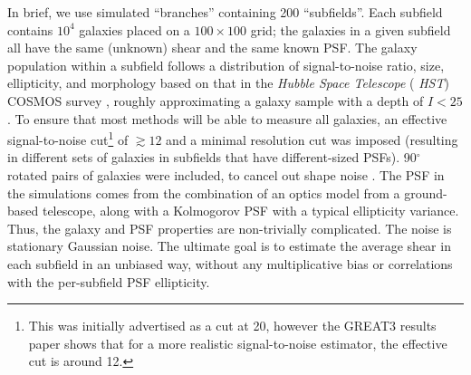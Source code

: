 \documentclass[iop]{emulateapj}
\newcommand\rmcomment[1]{\textcolor{red}{(RM: #1)}}
\begin{document}
In brief, we use simulated ``branches'' containing 200 ``subfields''.
Each subfield contains $10^4$ galaxies placed on a $100\times 100$
grid; the galaxies in a given subfield all have the same (unknown)
shear and the same known PSF.  The galaxy population within a subfield
follows a distribution of signal-to-noise ratio, size, ellipticity,
and morphology based on that in the {\it Hubble Space Telescope} ({\it
  HST}) COSMOS survey
\citep{2007ApJS..172..196K,2007ApJS..172....1S,2007ApJS..172...38S},
roughly approximating a galaxy sample with a depth of $I<25$.  To
ensure that most methods will be able to measure all galaxies, an
effective signal-to-noise cut\footnote{This was initially advertised as a cut at 20, however the
  GREAT3 results paper shows that for a more realistic signal-to-noise estimator, the effective cut
  is around 12.} of $\gtrsim 12$ and a minimal resolution
cut was imposed (resulting in different sets of galaxies in subfields
that have different-sized PSFs).  90$^\circ$ rotated pairs of galaxies
were included, to cancel out shape noise \citep{2007MNRAS.376...13M}.
The PSF in the simulations comes from the combination of an optics
model from a ground-based telescope, along with a Kolmogorov PSF with
a typical ellipticity variance.  Thus, the galaxy and PSF properties
are non-trivially complicated.  The noise is stationary Gaussian
noise.  The ultimate goal is to estimate the average shear in each
subfield in an unbiased way, without any multiplicative bias or
correlations with the per-subfield PSF ellipticity.

\end{document}
